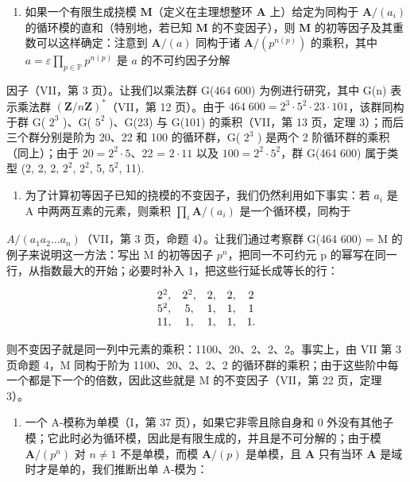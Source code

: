 \begin{enumerate}
\def\labelenumi{\arabic{enumi})}
\setcounter{enumi}{1}
\tightlist
\item
  如果一个有限生成挠模 \(\mathbf{M}\)（定义在主理想整环 \(\mathbf{A}\) 上）给定为同构于 \(\mathbf{A} / (a_i)\) 的循环模的直和（特别地，若已知 \(\mathbf{M}\) 的不变因子），则 \(\mathbf{M}\) 的初等因子及其重数可以这样确定：注意到 \(\mathbf{A} / (a)\) 同构于诸 \(\mathbf{A} / (p^{n(p)})\) 的乘积，其中 \(a = \varepsilon \prod_{p \in \mathbb{P}} p^{n(p)}\) 是 \(a\) 的不可约因子分解
\end{enumerate}

因子（VII，第 3 页）。让我们以乘法群 G(464 600) 为例进行研究，其中 G(n) 表示乘法群 \((\mathbf{Z}/n\mathbf{Z})^{*}\)（VII，第 12 页）。由于 \(464\;600 = 2^{3}\cdot5^{2}\cdot23\cdot101\)，该群同构于群 G( \(2^{3}\) )、G( \(5^{2}\) )、G(23) 与 G(101) 的乘积（VII，第 13 页，定理 3）；而后三个群分别是阶为 20、22 和 100 的循环群，G( \(2^{3}\) ) 是两个 2 阶循环群的乘积（同上）；由于 \(20 = 2^{2}\cdot5\)、22 = \(2\cdot 11\) 以及 \(100 = 2^{2}\cdot5^{2}\)，群 G(464 600) 属于类型 (2, 2, 2, \(2^{2}\), \(2^{2}\), 5, \(5^{2}\), 11).

\begin{enumerate}
\def\labelenumi{\arabic{enumi})}
\setcounter{enumi}{2}
\tightlist
\item
  为了计算初等因子已知的挠模的不变因子，我们仍然利用如下事实：若 \(a_{i}\) 是 A 中两两互素的元素，则乘积 \(\prod_{i}\mathbf{A}/(a_{i})\) 是一个循环模，同构于
\end{enumerate}

\(A/(a_{1}a_{2}\ldots a_{n})\)（VII，第 3 页，命题 4）。让我们通过考察群 G(464 600) = M 的例子来说明这一方法：写出 M 的初等因子 \(p^{n}\)，把同一不可约元 p 的幂写在同一行，从指数最大的开始；必要时补入 1，把这些行延长成等长的行：

\[
\begin{array}{c c c c c} 2 ^ {2}, & 2 ^ {2}, & 2, & 2, & 2 \\ 5 ^ {2}, & 5, & 1, & 1, & 1 \\ 11, & 1, & 1, & 1, & 1. \end{array}
\]

则不变因子就是同一列中元素的乘积：1100、20、2、2、2。事实上，由 VII 第 3 页命题 4，M 同构于阶为 1100、20、2、2、2 的循环群的乘积；由于这些阶中每一个都是下一个的倍数，因此这些就是 M 的不变因子（VII，第 22 页，定理 3）。

\begin{enumerate}
\def\labelenumi{\arabic{enumi})}
\setcounter{enumi}{3}
\tightlist
\item
  一个 A-模称为单模（I，第 37 页），如果它非零且除自身和 0 外没有其他子模；它此时必为循环模，因此是有限生成的，并且是不可分解的；由于模 \(\mathbf{A} / (p^n)\) 对 \(n \neq 1\) 不是单模，而模 \(\mathbf{A} / (p)\) 是单模，且 \(\mathbf{A}\) 只有当环 \(\mathbf{A}\) 是域时才是单的，我们推断出单 A-模为：
\end{enumerate}

